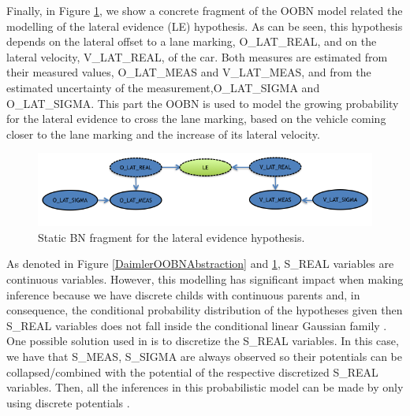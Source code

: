Finally, in Figure \ref{Figure:DaimlerLE}, we show a concrete fragment of the OOBN model related the modelling of the lateral evidence (LE) hypothesis. As can be seen, this hypothesis depends on the lateral offset to a lane marking, O\_LAT\_REAL, and on the lateral velocity, V\_LAT\_REAL, of the car. Both measures are estimated from their measured values, O\_LAT\_MEAS and V\_LAT\_MEAS, and from the estimated uncertainty of the measurement,O\_LAT\_SIGMA and O\_LAT\_SIGMA. This part the OOBN is used to model the growing probability for the lateral evidence to cross the lane marking, based on the vehicle coming closer to the lane marking and the increase of its lateral velocity.

\begin{figure}
\begin{center}
\includegraphics[scale=0.58]{./figures/DaimlerLE}
\caption{\label{Figure:DaimlerLE} Static BN fragment for the lateral evidence hypothesis.}
\end{center}
\end{figure}

As denoted in Figure \ref{DaimlerOOBNAbstraction} and \ref{Figure:DaimlerLE}, S\_REAL variables are continuous variables. However, this modelling has significant impact when making inference because we have discrete childs with continuous parents and, in consequence, the conditional probability distribution of the hypotheses given then S\_REAL variables does not fall inside the conditional linear Gaussian family \cite{nielsen2009bayesian}. One possible solution used in  \cite{kasper2012object} is to discretize the S\_REAL variables. In this case, we have that S\_MEAS, S\_SIGMA are always observed so their potentials can be collapsed/combined with the potential of the respective  discretized S\_REAL variables. Then, all the inferences in this probabilistic model can be made by only using discrete potentials \cite{nielsen2009bayesian}.

